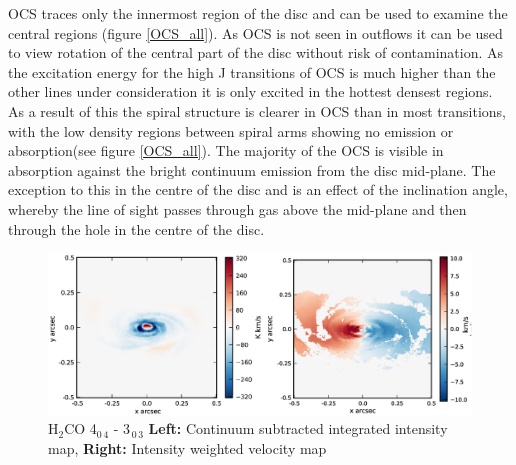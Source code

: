 \documentclass[useAMS,usenatbib]{mn2e}
\begin{document}


OCS traces only the innermost region of the disc and can be used to examine the central regions (figure \ref{OCS_all}). As OCS is not seen in outflows it can be used to view rotation of the central part of the disc without risk of contamination. As the excitation energy for the high J transitions of OCS is much higher than the other lines under consideration it is only excited in the hottest densest regions. As a result of this the spiral structure is clearer in OCS than in most transitions, with the low density regions between spiral arms showing no emission or absorption(see figure \ref{OCS_all}). The majority of the OCS is visible in absorption against the bright continuum emission from the disc mid-plane. The exception to this in the centre of the disc and is an effect of the inclination angle, whereby the line of sight passes through gas above the mid-plane and then through the hole in the centre of the disc. 

 
%


\begin{figure}
 \includegraphics[width=168mm]{Figures/sim/imageH2CO_4-0-4--3-0-3_30deg_composite_all.eps}
 \caption{H$_2$CO 4$_{0\,4}$ - 3$_{\,0\,3}$ {\bf Left:} Continuum subtracted integrated intensity map, {\bf Right:} Intensity weighted velocity map}
 \label{h2co_all}
\end{figure}
\end{document}
